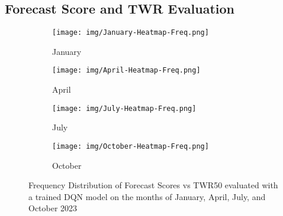 \subsection{Forecast Score and TWR Evaluation}\label{section:Discussion_FS&TWR}






\begin{figure*}[!t]  %
  \centering
  \begin{subfigure}[t]{0.25\textwidth}  %
    \centering
    \texttt{[image: img/January-Heatmap-Freq.png]}  
    \caption{January} \label{fig1}
  \end{subfigure}%
  \begin{subfigure}[t]{0.25\textwidth}  %
    \centering
    \texttt{[image: img/April-Heatmap-Freq.png]}  
    \caption{April} \label{fig2}
  \end{subfigure}%
  \begin{subfigure}[t]{0.25\textwidth}  %
    \centering
    \texttt{[image: img/July-Heatmap-Freq.png]}  
    \caption{July} \label{fig3}
  \end{subfigure}%
  \begin{subfigure}[t]{0.25\textwidth}  %
    \centering
    \texttt{[image: img/October-Heatmap-Freq.png]}
    \caption{October} \label{fig4}
  \end{subfigure}

\caption{Frequency Distribution of Forecast Scores vs TWR50 evaluated with a trained DQN model on the months of January, April, July, and October 2023}
\label{fig:Heatmaps}
\end{figure*}

